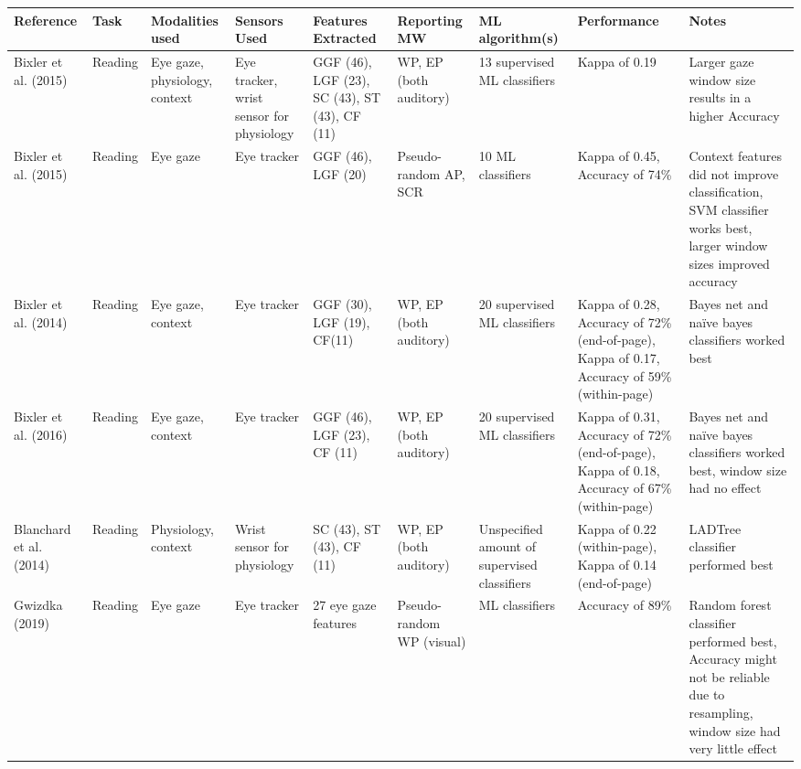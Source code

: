 \begin{ThreePartTable}
\small %
        \begin{xtabular}{P{20mm}P{24mm}P{22mm}P{24mm}P{28mm}P{21mm}P{26mm}P{24mm}P{42mm}}
                \toprule
                Reference & Task & Modalities used & Sensors Used & Features Extracted \footnotemark[1] & Reporting MW \footnotemark[2] & ML algorithm(s) & Performance & Notes\\
                \midrule
                Bixler et al. (2015) \cite{Bixler2015AutomaticPhysiology} & Reading & Eye gaze, physiology, context & Eye tracker, wrist sensor for physiology & GGF (46), LGF (23), SC (43), ST (43), CF (11) & WP, EP (both auditory) & 13 supervised ML classifiers & Kappa of 0.19 & Larger gaze window size results in a higher Accuracy \\ \midrule
                Bixler et al. (2015) \cite{Bixler2015AutomaticAwareness} & Reading & Eye gaze & Eye tracker & GGF (46), LGF (20) & Pseudo-random AP, SCR & 10 ML classifiers & Kappa of 0.45, Accuracy of 74\% & Context features did not improve classification, SVM classifier works best, larger window sizes improved accuracy\\ \midrule
                Bixler et al. (2014) \cite{Bixler2014TowardWanderingd} & Reading & Eye gaze, context & Eye tracker & GGF (30), LGF (19), CF(11) & WP, EP (both auditory) & 20 supervised ML classifiers & Kappa of 0.28, Accuracy of 72\% (end-of-page), Kappa of 0.17, Accuracy of 59\% (within-page) & Bayes net and naïve bayes classifiers worked best \\ \midrule
                Bixler et al. (2016) \cite{Bixler2016AutomaticReadingd} & Reading & Eye gaze, context & Eye tracker & GGF (46), LGF (23), CF (11) & WP, EP (both auditory) & 20 supervised ML classifiers & Kappa of 0.31, Accuracy of 72\% (end-of-page), Kappa of 0.18, Accuracy of 67\% (within-page) & Bayes net and naïve bayes classifiers worked best, window size had no effect \\ \midrule
                Blanchard et al. (2014) \cite{Blanchard2014AutomatedLearning} & Reading & Physiology, context & Wrist sensor for physiology & SC (43), ST (43), CF (11) & WP, EP (both auditory) & Unspecified amount of supervised classifiers & Kappa of 0.22 (within-page), Kappa of 0.14 (end-of-page) & LADTree classifier performed best \\ \midrule
                Gwizdka (2019) \cite{Gwizdka2019ExploringTasks} & Reading & Eye gaze & Eye tracker & 27 eye gaze features & Pseudo-random WP (visual) & ML classifiers & Accuracy of 89\% & Random forest classifier performed best, Accuracy might not be reliable due to resampling, window size had very little effect \\ \midrule

\end{xtabular}
\end{ThreePartTable}
